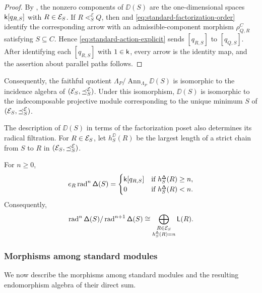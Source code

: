 \begin{proof}
By , the nonzero components of
$\DD(S)$ are the one-dimensional spaces $\mathsf{k}[q_{R,S}]$ with
$R\in\mathcal E_S$.  If
$R\lessdot_S^{\mathcal E}Q$, then
 and
\eqref{eq:standard-factorization-order} identify the corresponding
arrow with an admissible-component morphism
$\rho_{Q,R}^{C}$ satisfying $S\subseteq C$.
Hence \eqref{eq:standard-action-explicit} sends
$[q_{R,S}]$ to $[q_{Q,S}]$.
After identifying each $[q_{R,S}]$ with $1\in\mathsf{k}$, every arrow is the
identity map, and the assertion about parallel paths follows.
\end{proof}


Consequently, the faithful quotient
$\Lambda_P/\operatorname{Ann}_{\Lambda_P}\DD(S)$ is isomorphic to the
incidence algebra of $(\mathcal E_S,\preceq_S^{\mathcal E})$. Under this
isomorphism, $\DD(S)$ is isomorphic to the indecomposable projective
module corresponding to the unique minimum $S$ of
$(\mathcal E_S,\preceq_S^{\mathcal E})$.

The description of $\DD(S)$ in terms of the factorization poset also determines its radical filtration. 
For $R\in\mathcal E_S$, let $h_S^{\DD}(R)$ be the largest length of a strict chain from $S$ to $R$ in
$(\mathcal E_S,\preceq_S^{\mathcal E})$.

\begin{corollary}
\label{cor:standard-loewy}
For $n\geq0$,
\begin{equation}
e_R\operatorname{rad}^n\mathsf\Delta(S)
=
\begin{cases}
\mathsf{k}[q_{R,S}] & \text{if }h_S^{\mathsf\Delta}(R)\geq n,\\
0            & \text{if }h_S^{\mathsf\Delta}(R)<n.
\end{cases}
\label{eq:standard-radical-components}
\end{equation}
Consequently,
\begin{equation}
\operatorname{rad}^n\mathsf\Delta(S)/\operatorname{rad}^{n+1}\mathsf\Delta(S)
\cong
\bigoplus_{\substack{R\in\mathcal E_S\\ h_S^{\mathsf\Delta}(R)=n}}
\mathsf L(R).
\label{eq:standard-radical-layers}
\end{equation}
\end{corollary}



\subsubsection{Morphisms among standard modules}
\label{sec:standard-morphisms}

We now describe the morphisms among standard modules and the resulting
endomorphism algebra of their direct sum.

